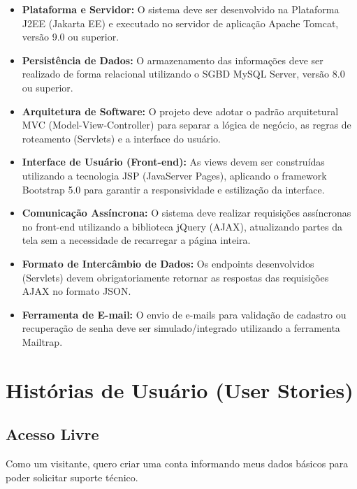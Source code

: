 \documentclass[a4paper, 12pt]{article}
\begin{document}
\begin{itemize}
    \item \textbf{Plataforma e Servidor:} O sistema deve ser desenvolvido na Plataforma J2EE (Jakarta EE) e executado no servidor de aplicação Apache Tomcat, versão 9.0 ou superior.

    \item \textbf{Persistência de Dados:} O armazenamento das informações deve ser realizado de forma relacional utilizando o SGBD MySQL Server, versão 8.0 ou superior.

    \item \textbf{Arquitetura de Software:} O projeto deve adotar o padrão arquitetural MVC (Model-View-Controller) para separar a lógica de negócio, as regras de roteamento (Servlets) e a interface do usuário.

    \item \textbf{Interface de Usuário (Front-end):} As views devem ser construídas utilizando a tecnologia JSP (JavaServer Pages), aplicando o framework Bootstrap 5.0 para garantir a responsividade e estilização da interface.

    \item \textbf{Comunicação Assíncrona:} O sistema deve realizar requisições assíncronas no front-end utilizando a biblioteca jQuery (AJAX), atualizando partes da tela sem a necessidade de recarregar a página inteira.

    \item \textbf{Formato de Intercâmbio de Dados:} Os endpoints desenvolvidos (Servlets) devem obrigatoriamente retornar as respostas das requisições AJAX no formato JSON.

    \item \textbf{Ferramenta de E-mail:} O envio de e-mails para validação de cadastro ou recuperação de senha deve ser simulado/integrado utilizando a ferramenta Mailtrap.
\end{itemize}

\newpage
\section{Histórias de Usuário (User Stories)}
\subsection{Acesso Livre}
    
    Como um visitante, quero criar uma conta informando meus dados básicos para poder solicitar suporte técnico.
    
\end{document}
